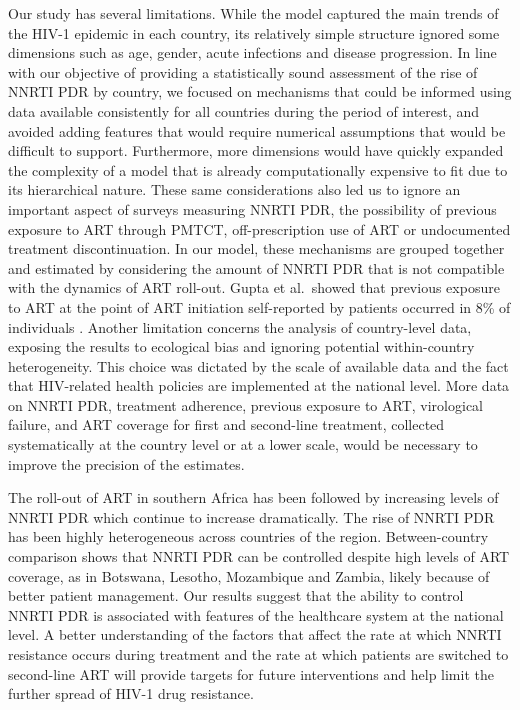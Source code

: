 \documentclass{article}
\begin{document}
Our study has several limitations. While the model captured the main trends of the HIV-1 epidemic in each country, its relatively simple structure ignored some dimensions such as age, gender, acute infections and disease progression. In line with our objective of providing a statistically sound assessment of the rise of NNRTI PDR  by country, we focused on mechanisms that could be informed using data available consistently for all countries during the period of interest, and avoided adding features that would require numerical assumptions that would be difficult to support. Furthermore, more dimensions would have quickly expanded the complexity of a model that is already computationally expensive to fit due to its hierarchical nature. These same considerations also led us to ignore an important aspect of surveys measuring NNRTI PDR, the possibility of previous exposure to ART through PMTCT, off-prescription use of ART or undocumented treatment discontinuation. In our model, these mechanisms are grouped together and estimated by considering the amount of NNRTI PDR that is not compatible with the dynamics of ART roll-out. Gupta et al. showed that previous exposure to ART at the point of ART initiation self-reported by patients occurred in 8\% of individuals \cite{gupta2018hiv}. Another limitation concerns the analysis of country-level data, exposing the results to ecological bias and ignoring potential within-country heterogeneity. This choice was dictated by the scale of available data and the fact that HIV-related health policies are implemented at the national level. More data on NNRTI PDR, treatment adherence, previous exposure to ART, virological failure, and ART coverage for first and second-line treatment, collected systematically at the country level or at a lower scale, would be necessary to improve the precision of the estimates.

The roll-out of ART in southern Africa has been followed by increasing levels of NNRTI PDR which continue to increase dramatically. The rise of NNRTI PDR has been highly heterogeneous across countries of the region. Between-country comparison shows that NNRTI PDR can be controlled despite high levels of ART coverage, as in Botswana, Lesotho, Mozambique and Zambia, likely because of better patient management. Our results suggest that the ability to control NNRTI PDR is associated with features of the healthcare system at the national level. A better understanding of the factors that affect the rate at which NNRTI resistance occurs during treatment and the rate at which patients are switched to second-line ART will provide targets for future interventions and help limit the further spread of HIV-1 drug resistance.
\end{document}
